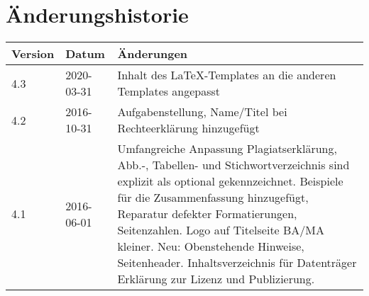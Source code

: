 \section*{Änderungshistorie}


\begin{tabularx}{\textwidth}{@{}llX@{}}
\toprule
\bfseries Version & \bfseries Datum & \bfseries Änderungen \\
\midrule
4.3 & 2020-03-31 & Inhalt des \LaTeX-Templates an die anderen Templates angepasst \\
\midrule
4.2 & 2016-10-31 & Aufgabenstellung, Name/Titel bei Rechteerklärung hinzugefügt \\
\midrule
4.1 & 2016-06-01 & Umfangreiche Anpassung Plagiatserklärung, Abb.-, Tabellen- und Stichwortverzeichnis sind explizit als optional gekennzeichnet. Beispiele für die Zusammenfassung hinzugefügt, Reparatur defekter Formatierungen, Seitenzahlen. Logo auf Titelseite BA/MA kleiner.
Neu: Obenstehende Hinweise, Seitenheader. Inhaltsverzeichnis für Datenträger Erklärung zur Lizenz und Publizierung. \\
\bottomrule
\end{tabularx}
